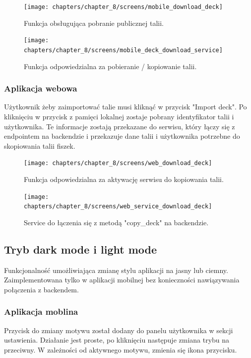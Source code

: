\begin{figure}[H]
    \centering
    \texttt{[image: chapters/chapter\_8/screens/mobile\_download\_deck]}
    \caption{Funkcja obsługująca pobranie publicznej talii.}
    \label{img:mobile_download_deck}
\end{figure}

\begin{figure}[H]
    \centering
    \texttt{[image: chapters/chapter\_8/screens/mobile\_deck\_download\_service]}
    \caption{Funkcja odpowiedzialna za pobieranie / kopiowanie talii.}
    \label{img:mobile_deck_download_service}
\end{figure}

\subsubsection{Aplikacja webowa}
Użytkownik żeby zaimportować talie musi kliknąć w przycisk "Import deck". Po kliknięciu w przycisk z pamięci lokalnej zostaje pobrany identyfikator talii i użytkownika. Te informacje zostają przekazane do serwisu, który łączy się z endpointem na backendzie i przekazuje dane talii i użytkownika potrzebne do skopiowania talii fiszek.

\begin{figure}[H]
    \centering
    \texttt{[image: chapters/chapter\_8/screens/web\_download\_deck]}
    \caption{Funkcja odpowiedzialna za aktywację serwisu do kopiowania talii.}
    \label{img:web_download_deck}
\end{figure}

\begin{figure}[H]
    \centering
    \texttt{[image: chapters/chapter\_8/screens/web\_service\_download\_deck]}
    \caption{Service do łączenia się z metodą "copy\_deck" na backendzie.}
    \label{img:web_service_download_deck}
\end{figure}

\subsection{Tryb dark mode i light mode}
Funkcjonalność umożliwiająca zmianę stylu aplikacji na jasny lub ciemny. Zaimplementowana tylko w aplikacji mobilnej bez konieczności nawiązywania połączenia z backendem.

\subsubsection{Aplikacja moblina}
Przycisk do zmiany motywu został dodany do panelu użytkownika w sekcji ustawienia. Działanie jest proste, po kliknięciu następuje zmiana trybu na przeciwny. W zależności od aktywnego motywu, zmienia się ikona przycisku.


